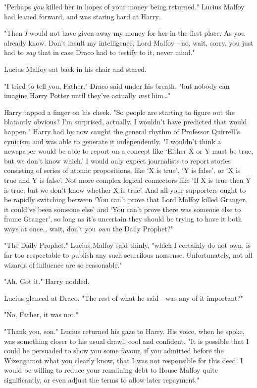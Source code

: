 "Perhaps \emph{you} killed her in hopes of your money being returned." Lucius
Malfoy had leaned forward, and was staring hard at Harry.

"Then \emph{I} would not have given away my money for her in the first place.
As you already know. Don't insult my intelligence, Lord Malfoy---no, wait,
sorry, you just had to \emph{say} that in case Draco had to testify to it,
never mind."

Lucius Malfoy sat back in his chair and stared.

"I tried to tell you, Father," Draco said under his breath, "but nobody can
imagine Harry Potter until they've actually \emph{met} him{\ldots}"

Harry tapped a finger on his cheek. "So people are starting to figure out the
blatantly obvious? I'm surprised, actually. I wouldn't have predicted that
would happen." Harry had by now caught the general rhythm of Professor
Quirrell's cynicism and was able to generate it independently. "I wouldn't
think a newspaper would be able to report on a concept like `Either X or Y must
be true, but we don't know which.' I would only expect journalists to report
stories consisting of series of atomic propositions, like `X is true', `Y is
false', or `X is true and Y is false'. Not more complex logical connectors like
`If X is true then Y is true, but we don't know whether X is true'. And all
your supporters ought to be rapidly switching between `You can't prove that
Lord Malfoy killed Granger, it could've been someone else' and `You can't prove
there was someone else to frame Granger', so long as it's uncertain they should
be trying to have it both ways at once{\ldots} wait, don't you \emph{own} the
Daily Prophet?"

"The Daily Prophet," Lucius Malfoy said thinly, "which I certainly do not own,
is far too respectable to publish any such scurrilous nonsense. Unfortunately,
not all wizards of influence are so reasonable."

"Ah. Got it." Harry nodded.

Lucius glanced at Draco. "The rest of what he said---was any of it important?"

"No, Father, it was not."

"Thank you, son." Lucius returned his gaze to Harry. His voice, when he spoke,
was something closer to his usual drawl, cool and confident. "It is possible
that I could be persuaded to show you some favour, if you admitted before the
Wizengamot what you clearly know, that I was not responsible for this deed. I
would be willing to reduce your remaining debt to House Malfoy quite
significantly, or even adjust the terms to allow later repayment."

